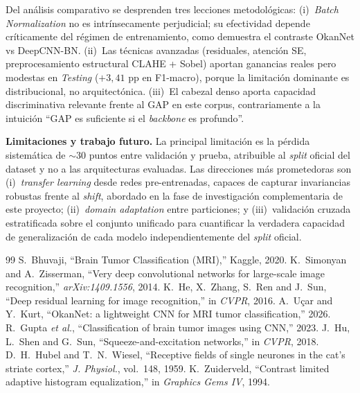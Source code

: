\documentclass[conference]{IEEEtran}
\begin{document}
Del análisis comparativo se desprenden tres lecciones
metodológicas: (i)~\textit{Batch Normalization} no es
intrínsecamente perjudicial; su efectividad depende
críticamente del régimen de entrenamiento, como demuestra el
contraste OkanNet vs DeepCNN-BN. (ii)~Las técnicas avanzadas
(residuales, atención SE, preprocesamiento estructural CLAHE
+ Sobel) aportan ganancias reales pero modestas en
\textit{Testing} ($+3{,}41$ pp en F1-macro), porque la
limitación dominante es distribucional, no arquitectónica.
(iii)~El cabezal denso aporta capacidad discriminativa
relevante frente al GAP en este corpus, contrariamente a la
intuición ``GAP es suficiente si el \textit{backbone} es
profundo''.

\textbf{Limitaciones y trabajo futuro.} La principal limitación
es la pérdida sistemática de $\sim 30$ puntos entre validación
y prueba, atribuible al \textit{split} oficial del dataset y
no a las arquitecturas evaluadas. Las direcciones más
prometedoras son (i)~\textit{transfer learning} desde redes
pre-entrenadas, capaces de capturar invariancias robustas
frente al \textit{shift}, abordado en la fase de
investigación complementaria de este proyecto;
(ii)~\textit{domain adaptation} entre particiones; y
(iii)~validación cruzada estratificada sobre el conjunto
unificado para cuantificar la verdadera capacidad de
generalización de cada modelo independientemente del
\textit{split} oficial.

\begin{thebibliography}{99}
 S.~Bhuvaji, ``Brain Tumor
Classification (MRI),'' Kaggle, 2020.
 K.~Simonyan and A.~Zisserman, ``Very
deep convolutional networks for large-scale image
recognition,'' \textit{arXiv:1409.1556}, 2014.
 K.~He, X.~Zhang, S.~Ren and J.~Sun,
``Deep residual learning for image recognition,'' in
\textit{CVPR}, 2016.
 A.~Uçar and Y.~Kurt, ``OkanNet: a
lightweight CNN for MRI tumor classification,'' 2026.
 R.~Gupta \textit{et al.}, ``Classification
of brain tumor images using CNN,'' 2023.
 J.~Hu, L.~Shen and G.~Sun,
``Squeeze-and-excitation networks,'' in \textit{CVPR}, 2018.
 D.~H.~Hubel and T.~N.~Wiesel,
``Receptive fields of single neurones in the cat's striate
cortex,'' \textit{J. Physiol.}, vol.~148, 1959.
 K.~Zuiderveld, ``Contrast
limited adaptive histogram equalization,'' in \textit{Graphics
Gems IV}, 1994.
\end{thebibliography}
\end{document}
